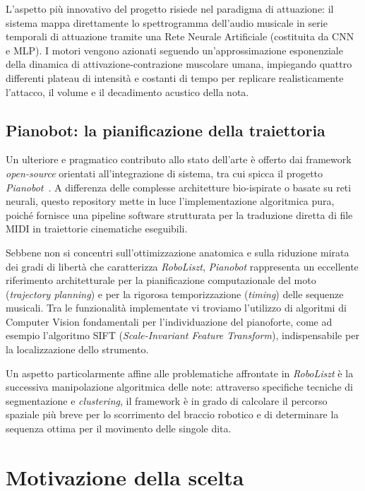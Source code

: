 L'aspetto più innovativo del progetto risiede nel paradigma di attuazione: il sistema mappa direttamente lo spettrogramma dell'audio musicale in serie temporali di attuazione tramite una Rete Neurale Artificiale (costituita da CNN e MLP). 
I motori vengono azionati seguendo un'approssimazione esponenziale della dinamica di attivazione-contrazione muscolare umana, impiegando quattro differenti plateau di intensità e costanti di tempo per replicare realisticamente l'attacco, il volume e il decadimento acustico della nota.

\subsection{Pianobot: la pianificazione della traiettoria}

Un ulteriore e pragmatico contributo allo stato dell'arte è offerto dai framework \textit{open-source} orientati all'integrazione di sistema, tra cui spicca il progetto \textit{Pianobot}~\cite{pianobot_lin}. 
A differenza delle complesse architetture bio-ispirate o basate su reti neurali, questo repository mette in luce l'implementazione algoritmica pura, poiché fornisce una pipeline software strutturata per la traduzione diretta di file MIDI in traiettorie cinematiche eseguibili.

Sebbene non si concentri sull'ottimizzazione anatomica e sulla riduzione mirata dei gradi di libertà che caratterizza \textit{RoboLiszt}, \textit{Pianobot} rappresenta un eccellente riferimento architetturale per la pianificazione computazionale del moto (\textit{trajectory planning}) e per la rigorosa temporizzazione (\textit{timing}) delle sequenze musicali.
Tra le funzionalità implementate vi troviamo l'utilizzo di algoritmi di Computer Vision fondamentali per l'individuazione del pianoforte, come ad esempio l'algoritmo SIFT (\textit{Scale-Invariant Feature Transform}), indispensabile per la localizzazione dello strumento.

Un aspetto particolarmente affine alle problematiche affrontate in \textit{RoboLiszt} è la successiva manipolazione algoritmica delle note: attraverso specifiche tecniche di segmentazione e \textit{clustering}, il framework è in grado di calcolare il percorso spaziale più breve per lo scorrimento del braccio robotico e di determinare la sequenza ottima per il movimento delle singole dita.

\section{Motivazione della scelta}

